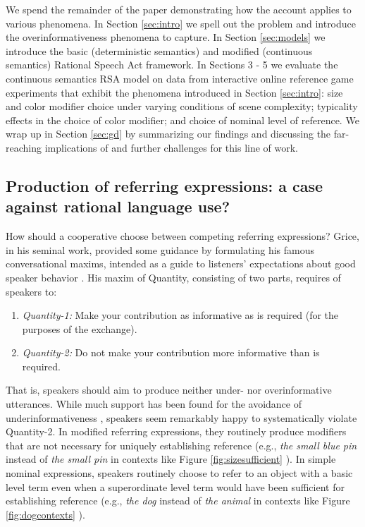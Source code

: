 \documentclass[11pt]{article}
\newcommand{\figref}[1]{Figure \ref{#1}}
\newcommand{\sectionref}[1]{Section \ref{#1}}
\begin{document}
We spend the remainder of the paper demonstrating how the account applies to various phenomena. In \sectionref{sec:intro} we spell out the problem and introduce the overinformativeness phenomena to capture. In \sectionref{sec:models} we introduce the basic (deterministic semantics) and modified (continuous semantics) Rational Speech Act framework. In Sections 3 - 5 we evaluate the continuous semantics RSA model on data from interactive online reference game experiments that exhibit the phenomena introduced in \sectionref{sec:intro}: size and color modifier choice under varying conditions of scene complexity; typicality effects in the choice of color modifier; and choice of nominal level of reference. We wrap up in \sectionref{sec:gd} by summarizing our findings and discussing the far-reaching implications of and further challenges for this line of work.

\subsection{Production of referring expressions: a case against rational language use?}

How should a cooperative choose between competing referring expressions? Grice, in his seminal work, provided some guidance by formulating his famous conversational maxims, intended as a guide to listeners' expectations about good speaker behavior \cite{grice1975}. His maxim of Quantity, consisting of two parts, requires of speakers to:

\begin{enumerate}
	\item \emph{Quantity-1:} Make your contribution as informative as is required (for the purposes of the exchange).
	\item \emph{Quantity-2:} Do not make your contribution more informative than is required.
\end{enumerate}

That is, speakers should aim to produce neither under- nor overinformative utterances. While much support has been found for the avoidance of underinformativeness \cite{brennan1996, brown1958words, olson1970language, levinson1983pragmatics, Engelhardt2006, DaviesKatsos2013}, speakers seem remarkably happy to systematically violate Quantity-2. In modified referring expressions, they routinely produce modifiers that are not necessary for uniquely establishing reference (e.g., \emph{the small blue pin} instead of \emph{the small pin} in contexts like \figref{fig:sizesufficient} \cite{gatt2011, Gatt2014, Arts2011, Koolen2011}). In simple nominal expressions, speakers routinely choose to refer to an object with a basic level term even when a superordinate level term would have been sufficient for establishing reference (e.g., \emph{the dog} instead of \emph{the animal} in contexts like \figref{fig:dogcontexts} \cite{Rosch1976, hoffmann1983objektidentifikation, TanakaTaylor91_BasicLevelAndExpertise, Johnson1997, brown1958words}).
\end{document}
